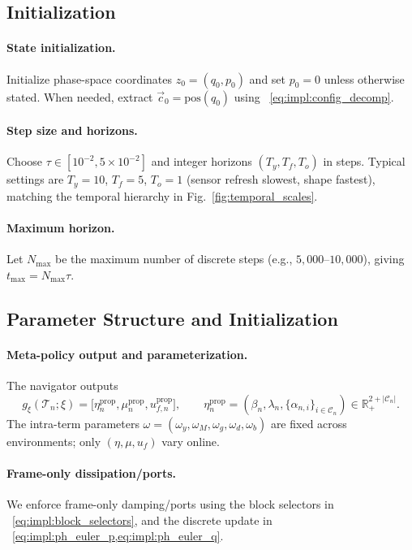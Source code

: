 \subsection{Initialization}
\label{subsec:initialization}

\paragraph{State initialization.}
Initialize phase-space coordinates $z_0=(q_0,p_0)$ and set $p_0=0$ unless otherwise stated. When needed,
extract $\vec c_0=\mathrm{pos}(q_0)$ using ~\cref{eq:impl:config_decomp}.

\paragraph{Step size and horizons.}
Choose $\tau \in [10^{-2},5{\times}10^{-2}]$ and integer horizons $(T_y,T_f,T_o)$ in steps.
Typical settings are $T_y{=}10$, $T_f{=}5$, $T_o{=}1$ (sensor refresh slowest, shape fastest),
matching the temporal hierarchy in Fig.~\ref{fig:temporal_scales}.

\paragraph{Maximum horizon.}
Let $N_{\max}$ be the maximum number of discrete steps (e.g., $5{,}000$--$10{,}000$), giving
$t_{\max}=N_{\max}\tau$.

\subsection{Parameter Structure and Initialization}
\label{subsec:parameter_structure}

\paragraph{Meta-policy output and parameterization.}
The navigator outputs
\[
g_\xi(\mathcal{T}_n;\xi)=\big[\eta_n^{\mathrm{prop}},\mu_n^{\mathrm{prop}},u_{f,n}^{\mathrm{prop}}\big],
\qquad
\eta_n^{\mathrm{prop}}=(\beta_n,\lambda_n,\{\alpha_{n,i}\}_{i\in\mathcal{C}_n})\in\mathbb{R}_+^{2+|\mathcal{C}_n|}.
\]
The intra-term parameters $\omega=(\omega_y,\omega_M,\omega_g,\omega_d,\omega_b)$ are fixed across environments;
only $(\eta,\mu,u_f)$ vary online.

\paragraph{Frame-only dissipation/ports.}
We enforce frame-only damping/ports using the block selectors in ~\cref{eq:impl:block_selectors},
and the discrete update in ~\cref{eq:impl:ph_euler_p,eq:impl:ph_euler_q}.

